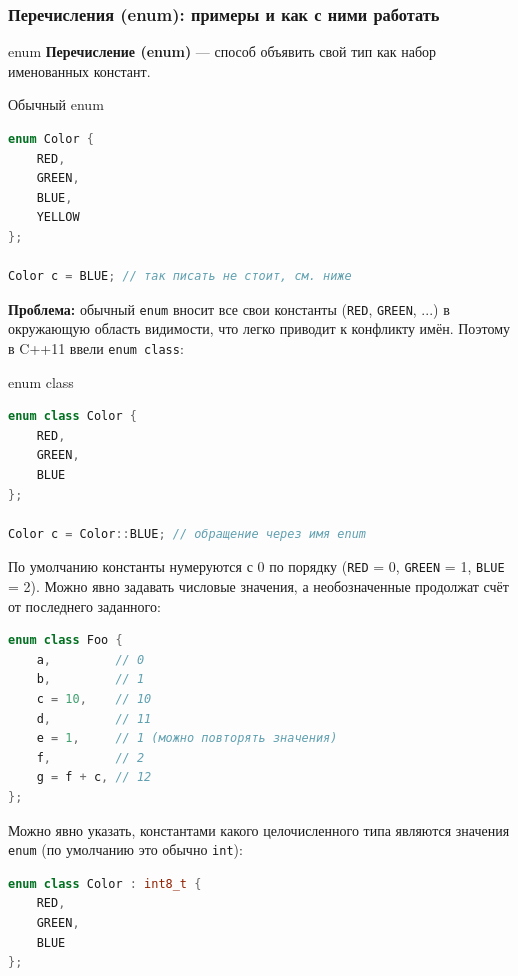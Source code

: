 \subsubsection{Перечисления (enum): примеры и как с ними работать}
\begin{definition}{enum}{}
\textbf{Перечисление (enum)} --- способ объявить свой тип как набор именованных констант.
\end{definition}
\begin{implementation}{Обычный enum}{}
\begin{lstlisting}[language=C++]
enum Color {
    RED,
    GREEN,
    BLUE,
    YELLOW
};

Color c = BLUE; // так писать не стоит, см. ниже
\end{lstlisting}
\end{implementation}
\textbf{Проблема:} обычный \texttt{enum} вносит все свои константы (\texttt{RED}, \texttt{GREEN}, ...) в окружающую область видимости, что легко приводит к конфликту имён. Поэтому в C++11 ввели \texttt{enum class}:
\begin{implementation}{enum class}{}
\begin{lstlisting}[language=C++]
enum class Color {
    RED,
    GREEN,
    BLUE
};

Color c = Color::BLUE; // обращение через имя enum
\end{lstlisting}
\end{implementation}
По умолчанию константы нумеруются с 0 по порядку (\texttt{RED} = 0, \texttt{GREEN} = 1, \texttt{BLUE} = 2). Можно явно задавать числовые значения, а необозначенные продолжат счёт от последнего заданного:
\begin{lstlisting}[language=C++]
enum class Foo {
    a,         // 0
    b,         // 1
    c = 10,    // 10
    d,         // 11
    e = 1,     // 1 (можно повторять значения)
    f,         // 2
    g = f + c, // 12
};
\end{lstlisting}
Можно явно указать, константами какого целочисленного типа являются значения \texttt{enum} (по умолчанию это обычно \texttt{int}):
\begin{lstlisting}[language=C++]
enum class Color : int8_t {
    RED,
    GREEN,
    BLUE
};
\end{lstlisting}
